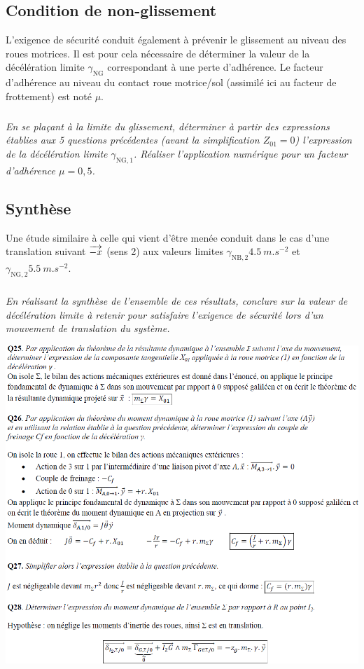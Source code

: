 \documentclass[10pt,fleqn]{article} %
\begin{document}
\begin{multicols}{2}
\subsection*{Condition de non-glissement}

L'exigence de sécurité conduit également à prévenir le glissement au niveau des roues motrices. Il est pour cela nécessaire de déterminer la valeur de la décélération limite $\gamma_{\text{NG}}$ correspondant à une perte d'adhérence. Le facteur d'adhérence au niveau du contact roue motrice/sol (assimilé ici au facteur de frottement) est noté $\mu$.

\subparagraph{}\textit{En se plaçant à la limite du glissement, déterminer à partir des expressions établies aux 5 questions précédentes (avant la simplification $Z_{01}=0$) l'expression de la décélération limite $\gamma_{\text{NG},1}$. Réaliser l'application numérique pour un facteur d'adhérence $\mu=0,5$.}

\subsection*{Synthèse}
Une étude similaire à celle qui vient d'être menée conduit dans le cas d'une translation suivant $\overrightarrow{-x}$ (sens 2) aux valeurs limites $\gamma_{\text{NB},2}\SI{4,5}{m.s^{-2}}$ et $\gamma_{\text{NG},2}\SI{5,5}{m.s^{-2}}$.

\subparagraph{}\textit{En réalisant la synthèse de l'ensemble de ces résultats, conclure sur la valeur de décélération limite à retenir pour satisfaire l'exigence de sécurité lors d'un mouvement de translation du système.}
\ifprof
\else
\end{multicols}
\fi

\newpage

\begin{center}
\includegraphics[width=.8\linewidth]{images/cor_01}
\end{center}
\end{document}
